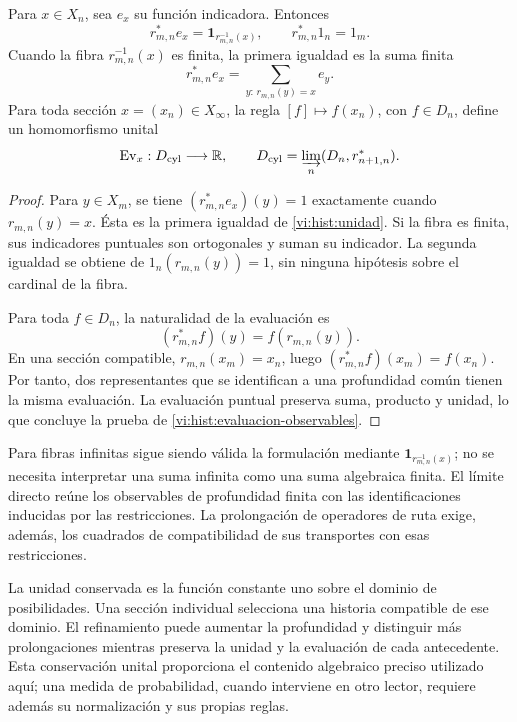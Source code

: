 \begin{lemma}
Para \(x\in X_n\), sea \(e_x\) su función indicadora. Entonces
\begin{equation}
 r_{m,n}^*e_x=\mathbf1_{r_{m,n}^{-1}(x)},\qquad
 r_{m,n}^*1_n=1_m.
 \label{vi:hist:unidad}
\end{equation}
Cuando la fibra \(r_{m,n}^{-1}(x)\) es finita, la primera igualdad es
la suma finita
\[
 r_{m,n}^*e_x=\sum_{y:\,r_{m,n}(y)=x}e_y.
\]
Para toda sección \(x=(x_n)\in X_\infty\), la regla
\([f]\mapsto f(x_n)\), con \(f\in D_n\), define un homomorfismo
unital
\begin{equation}
 \operatorname{Ev}_x:D_{\mathrm{cyl}}\longrightarrow\mathbb R,
 \qquad
 D_{\mathrm{cyl}}=\varinjlim_n(D_n,r_{n+1,n}^*).
 \label{vi:hist:evaluacion-observables}
\end{equation}
\end{lemma}
\begin{proof}
Para \(y\in X_m\), se tiene
\((r_{m,n}^*e_x)(y)=1\) exactamente cuando \(r_{m,n}(y)=x\).
Ésta es la primera igualdad de \eqref{vi:hist:unidad}. Si la fibra es
finita, sus indicadores puntuales son ortogonales y suman su indicador.
La segunda igualdad se obtiene de \(1_n(r_{m,n}(y))=1\), sin ninguna
hipótesis sobre el cardinal de la fibra.

Para toda \(f\in D_n\), la naturalidad de la evaluación es
\[
 (r_{m,n}^*f)(y)=f(r_{m,n}(y)).
\]
En una sección compatible, \(r_{m,n}(x_m)=x_n\), luego
\((r_{m,n}^*f)(x_m)=f(x_n)\). Por tanto, dos representantes que se
identifican a una profundidad común tienen la misma evaluación.
La evaluación puntual preserva suma, producto y unidad, lo que concluye
la prueba de \eqref{vi:hist:evaluacion-observables}.
\end{proof}

Para fibras infinitas sigue siendo válida la formulación mediante
\(\mathbf1_{r_{m,n}^{-1}(x)}\); no se necesita interpretar una suma
infinita como una suma algebraica finita. El límite directo reúne los
observables de profundidad finita con las identificaciones inducidas por
las restricciones. La prolongación de operadores de ruta exige, además,
los cuadrados de compatibilidad de sus transportes con esas restricciones.

La unidad conservada es la función constante uno sobre el dominio de
posibilidades. Una sección individual selecciona una historia compatible
de ese dominio. El refinamiento puede aumentar la profundidad y distinguir
más prolongaciones mientras preserva la unidad y la evaluación de cada
antecedente. Esta conservación unital proporciona el contenido algebraico
preciso utilizado aquí; una medida de probabilidad, cuando interviene en
otro lector, requiere además su normalización y sus propias reglas.
